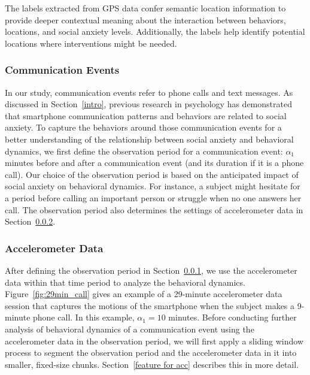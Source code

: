 The labels extracted from GPS data confer semantic location information to provide deeper contextual meaning about the  interaction between behaviors, locations, and social anxiety levels.  Additionally, the labels help identify potential locations where interventions might be needed.

\subsubsection{Communication Events}
\label{communicationEvent}


In our study, communication events refer to phone calls and text messages. As discussed in Section~\ref{intro}, previous research in psychology has demonstrated that smartphone communication patterns and behaviors are related to social anxiety.
To capture the behaviors around those communication events for a better understanding of the relationship between social anxiety and behavioral dynamics, we first define the observation period for a communication event: $\alpha_{1}$ minutes before and after a communication event (and its duration if it is a phone call).  Our choice of the observation period is based on the anticipated impact of social anxiety on behavioral dynamics. For instance, a subject might hesitate for a period before calling an important person or struggle when no one answers her call. The observation period also determines the settings of accelerometer data in Section~\ref{accdata}.%

\subsubsection{Accelerometer Data}
\label{accdata}
After defining the observation period in Section~\ref{communicationEvent}, we use the accelerometer data within that time period to analyze the behavioral dynamics.  Figure~\ref{fig:29min_call} gives an example of a 29-minute accelerometer data session that captures the motions of the smartphone when the subject makes a 9-minute phone call. In this example, $\alpha_{1}=10$ minutes.
Before conducting further analysis of behavioral dynamics of a communication event using the accelerometer data in the observation period, we will first apply a sliding window process to segment the observation period and the accelerometer data in it into smaller, fixed-size chunks. Section~\ref{feature for acc} describes this in more detail.


